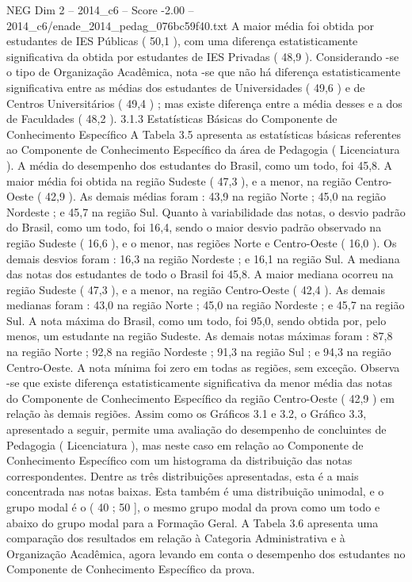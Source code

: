 \begin{textsample}{NEG Dim 2 – 2014\_c6 – Score -2.00 – 2014\_c6/enade\_2014\_pedag\_076bc59f40.txt}
A maior média foi obtida por estudantes de IES Públicas ( 50,1 ), com uma diferença estatisticamente significativa da obtida por estudantes de IES Privadas ( 48,9 ).
Considerando -se o tipo de Organização Acadêmica, nota -se que não há diferença estatisticamente significativa entre as médias dos estudantes de Universidades ( 49,6 ) e de Centros Universitários ( 49,4 ) ; mas existe diferença entre a média desses e a dos de Faculdades ( 48,2 ). 3.1.3 Estatísticas Básicas do Componente de Conhecimento Específico A Tabela 3.5 apresenta as estatísticas básicas referentes ao Componente de Conhecimento Específico da área de Pedagogia ( Licenciatura ).
A média do desempenho dos estudantes do Brasil, como um todo, foi 45,8.
A maior média foi obtida na região Sudeste ( 47,3 ), e a menor, na região Centro-Oeste ( 42,9 ).
As demais médias foram : 43,9 na região Norte ; 45,0 na região Nordeste ; e 45,7 na região Sul.
Quanto à variabilidade das notas, o desvio padrão do Brasil, como um todo, foi 16,4, sendo o maior desvio padrão observado na região Sudeste ( 16,6 ), e o menor, nas regiões Norte e Centro-Oeste ( 16,0 ).
Os demais desvios foram : 16,3 na região Nordeste ; e 16,1 na região Sul.
A mediana das notas dos estudantes de todo o Brasil foi 45,8.
A maior mediana ocorreu na região Sudeste ( 47,3 ), e a menor, na região Centro-Oeste ( 42,4 ).
As demais medianas foram : 43,0 na região Norte ; 45,0 na região Nordeste ; e 45,7 na região Sul.
A nota máxima do Brasil, como um todo, foi 95,0, sendo obtida por, pelo menos, um estudante na região Sudeste.
As demais notas máximas foram : 87,8 na região Norte ; 92,8 na região Nordeste ; 91,3 na região Sul ; e 94,3 na região Centro-Oeste.
A nota mínima foi zero em todas as regiões, sem exceção.
Observa -se que existe diferença estatisticamente significativa da menor média das notas do Componente de Conhecimento Específico da região Centro-Oeste ( 42,9 ) em relação às demais regiões.
Assim como os Gráficos 3.1 e 3.2, o Gráfico 3.3, apresentado a seguir, permite uma avaliação do desempenho de concluintes de Pedagogia ( Licenciatura ), mas neste caso em relação ao Componente de Conhecimento Específico com um histograma da distribuição das notas correspondentes.
Dentre as três distribuições apresentadas, esta é a mais concentrada nas notas baixas.
Esta também é uma distribuição unimodal, e o grupo modal é o ( 40 ; 50 ], o mesmo grupo modal da prova como um todo e abaixo do grupo modal para a Formação Geral.
A Tabela 3.6 apresenta uma comparação dos resultados em relação à Categoria Administrativa e à Organização Acadêmica, agora levando em conta o desempenho dos estudantes no Componente de Conhecimento Específico da prova.

\end{textsample}
